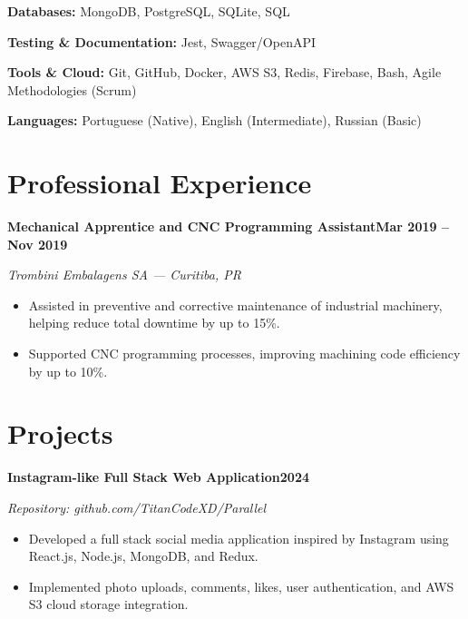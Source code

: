 \documentclass[11pt,a4paper]{article}
\newcommand{\entryheader}[2]{%
\noindent\textbf{#1}\hfill\textbf{#2}\par
}
\newcommand{\entrysub}[1]{%
\noindent\textit{\color{graytext}#1}\par\vspace{2pt}
}
\begin{document}
\textbf{Databases:} MongoDB, PostgreSQL, SQLite, SQL

\textbf{Testing \& Documentation:} Jest, Swagger/OpenAPI

\textbf{Tools \& Cloud:} Git, GitHub, Docker, AWS S3, Redis, Firebase, Bash, Agile Methodologies (Scrum)

\textbf{Languages:} Portuguese (Native), English (Intermediate), Russian (Basic)


\section{Professional Experience}

\entryheader{Mechanical Apprentice and CNC Programming Assistant}{Mar 2019 -- Nov 2019}

\entrysub{Trombini Embalagens SA --- Curitiba, PR}

\begin{itemize}

\item Assisted in preventive and corrective maintenance of industrial machinery, helping reduce total downtime by up to 15\%.

\item Supported CNC programming processes, improving machining code efficiency by up to 10\%.

\end{itemize}


\section{Projects}

\entryheader{Instagram-like Full Stack Web Application}{2024}

\entrysub{Repository: github.com/TitanCodeXD/Parallel}

\begin{itemize}

\item Developed a full stack social media application inspired by Instagram using React.js, Node.js, MongoDB, and Redux.

\item Implemented photo uploads, comments, likes, user authentication, and AWS S3 cloud storage integration.

\end{itemize}
\end{document}
